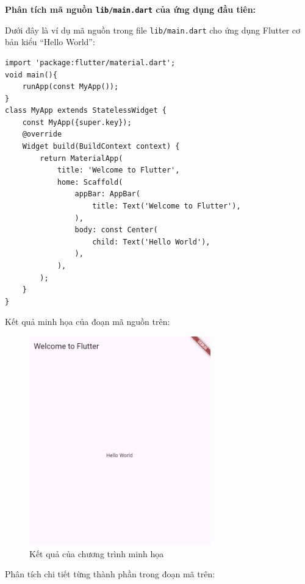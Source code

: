 \documentclass[../DoAn.tex]{subfiles}
\numberwithin{figure}{chapter}
\begin{document}
\textbf{Phân tích mã nguồn \texttt{lib/main.dart} của ứng dụng đầu tiên:}

Dưới đây là ví dụ mã nguồn trong file \texttt{lib/main.dart} cho ứng dụng Flutter cơ bản kiểu “Hello World”:

\begin{lstlisting}
import 'package:flutter/material.dart'; 
void main(){
    runApp(const MyApp());
}
class MyApp extends StatelessWidget { 
    const MyApp({super.key});
    @override 
    Widget build(BuildContext context) { 
        return MaterialApp( 
            title: 'Welcome to Flutter', 
            home: Scaffold( 
                appBar: AppBar( 
                    title: Text('Welcome to Flutter'), 
                ), 
                body: const Center( 
                    child: Text('Hello World'), 
                ), 
            ), 
        ); 
    }
}
\end{lstlisting}

Kết quả minh họa của đoạn mã nguồn trên:
\begin{figure}[H]
    \centering
    \includegraphics[width=0.7\textwidth]{Hinhve/Chuong5/demofirstprogram.png}
    \caption{Kết quả của chương trình minh họa}
    \label{fig:flutterstructure}
\end{figure}

Phân tích chi tiết từng thành phần trong đoạn mã trên:
\end{document}
